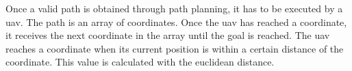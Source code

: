 Once a valid path is obtained through path planning, it has to be executed by a \acs{uav}. The path is an array of coordinates. Once the \acs{uav} has reached a coordinate, it receives the next coordinate in the array until the goal is reached. The \acs{uav} reaches a coordinate when its current position is within a certain distance of the coordinate. This value is calculated with the euclidean distance.